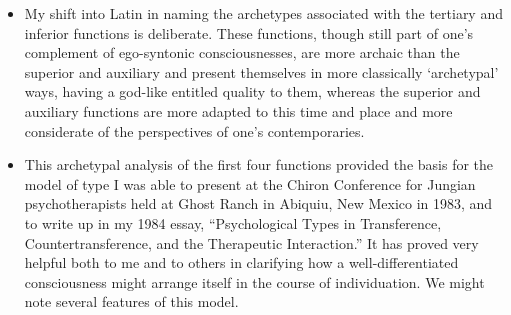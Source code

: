 \begin{itemize}
\item My shift into Latin in naming the archetypes associated with the tertiary
and inferior functions is deliberate. These functions, though still part of
one’s complement of ego-syntonic consciousnesses, are more archaic than the
superior and auxiliary and present themselves in more classically ‘archetypal’
ways, having a god-like entitled quality to them, whereas the superior and
auxiliary functions are more adapted to this time and place and more
considerate of the perspectives of one’s contemporaries.

\item {} This archetypal analysis of the first
four functions provided the basis for the model of type I was able to present
at the Chiron Conference for Jungian psychotherapists held at Ghost Ranch in
Abiquiu, New Mexico in 1983, and to write up in my 1984 essay, “Psychological
Types in Transference, Countertransference, and the Therapeutic Interaction.”
It has proved very helpful both to me and to others in clarifying how a
well-differentiated consciousness might arrange itself in the course of
individuation. We might note several features of this model.

\begin{figure}[h]
  \centering
\end{figure}
\end{itemize}
